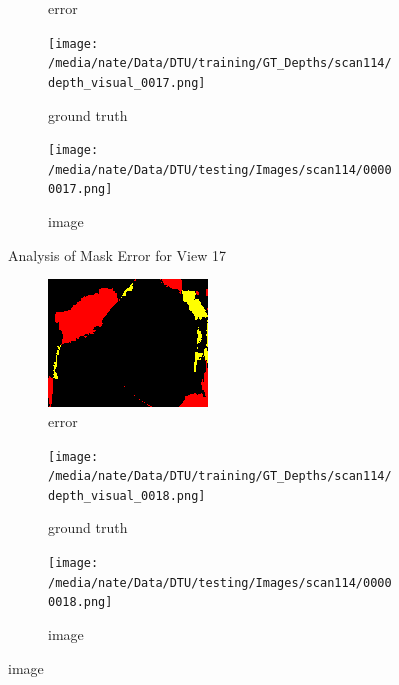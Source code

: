 \documentclass{article}
\begin{document}
\begin{figure}
\begin{subfigure}{0.3\textwidth}
		\caption{error}
		\label{fig:error17}
	\end{subfigure}
	\hfill
	\centering
	\begin{subfigure}{0.3\textwidth}
		\centering
		\texttt{[image: /media/nate/Data/DTU/training/GT\_Depths/scan114/depth\_visual\_0017.png]}
		\caption{ground truth}
		\label{fig:gt17}
	\end{subfigure}
	\hfill
	\centering
	\begin{subfigure}{0.3\textwidth}
		\centering
		\texttt{[image: /media/nate/Data/DTU/testing/Images/scan114/00000017.png]}
		\caption{image}
		\label{fig:img17}
	\end{subfigure}
	\hfill
	\caption{Analysis of Mask Error for View 17}
	\label{fig:error_analys17}
\end{figure}\begin{figure}
	\centering
	\begin{subfigure}{0.3\textwidth}
		\centering
		\includegraphics[width=\textwidth]{./output/018_error.png}
		\caption{error}
		\label{fig:error18}
	\end{subfigure}
	\hfill
	\centering
	\begin{subfigure}{0.3\textwidth}
		\centering
		\texttt{[image: /media/nate/Data/DTU/training/GT\_Depths/scan114/depth\_visual\_0018.png]}
		\caption{ground truth}
		\label{fig:gt18}
	\end{subfigure}
	\hfill
	\centering
	\begin{subfigure}{0.3\textwidth}
		\centering
		\texttt{[image: /media/nate/Data/DTU/testing/Images/scan114/00000018.png]}
		\caption{image}

\end{subfigure}
\end{figure}
\end{document}
